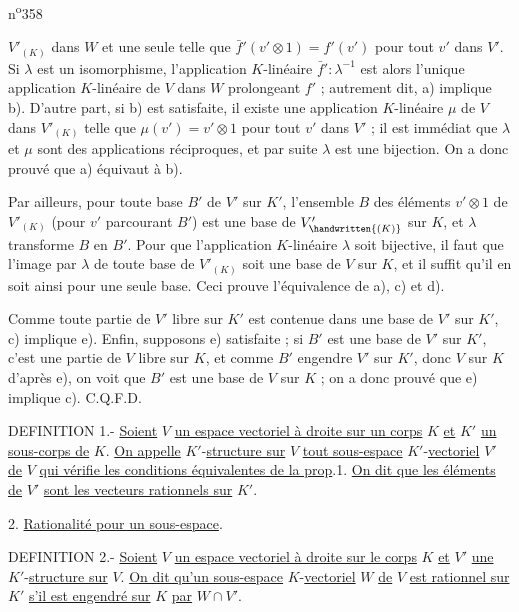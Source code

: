 \noindent\hfill n\textsuperscript{o}358

$V'_{(K)}$ dans $W$ et une seule telle que $\bar f'(v'\otimes 1)=f'(v')$ pour tout $v'$ dans $V'$. Si $\lambda$ est un isomorphisme, l'application $K$-linéaire $\bar f':\lambda^{-1}$ est alors l'unique application $K$-linéaire de $V$ dans $W$ prolongeant $f'$ ; autrement dit, a) implique b). D'autre part, si b) est satisfaite, il existe une application $K$-linéaire $\mu$ de $V$ dans $V'_{(K)}$ telle que $\mu(v')=v'\otimes 1$ pour tout $v'$ dans $V'$ ; il est immédiat que $\lambda$ et $\mu$ sont des applications réciproques, et par suite $\lambda$ est une bijection. On a donc prouvé que a) équivaut à b).

Par ailleurs, pour toute base $B'$ de $V'$ sur $K'$, l'ensemble $B$ des éléments $v'\otimes 1$ de $V'_{(K)}$ (pour $v'$ parcourant $B'$) est une base de $V'_{\handwritten{(K)}}$ sur $K$, et $\lambda$ transforme $B$ en $B'$. Pour que l'application $K$-linéaire $\lambda$ soit bijective, il faut que l'image par $\lambda$ de toute base de $V'_{(K)}$ soit une base de $V$ sur $K$, et il suffit qu'il en soit ainsi pour une seule base. Ceci prouve l'équivalence de a), c) et d).

Comme toute partie de $V'$ libre sur $K'$ est contenue dans une base de $V'$ sur $K'$, c) implique e). Enfin, supposons e) satisfaite ; si $B'$ est une base de $V'$ sur $K'$, c'est une partie de $V$ libre sur $K$, et comme $B'$ engendre $V'$ sur $K'$, donc $V$ sur $K$ d'après e), on voit que $B'$ est une base de $V$ sur $K$ ; on a donc prouvé que e) implique c). C.Q.F.D.

DEFINITION 1.- \uline{Soient} $V$ \uline{un espace vectoriel à droite sur un corps} $K$ \uline{et} $K'$ \uline{un sous-corps de} $K$. \uline{On appelle} $K'$-\uline{structure sur} $V$ \uline{tout sous-espace} $K'$-\uline{vectoriel} $V'$ \uline{de} $V$ \uline{qui vérifie les conditions équivalentes de la prop}.1. \uline{On dit que les éléments de} $V'$ \uline{sont les vecteurs rationnels sur} $K'$.

2. \uline{Rationalité pour un sous-espace}.

DEFINITION 2.- \uline{Soient} $V$ \uline{un espace vectoriel à droite sur le corps} $K$ \uline{et} $V'$ \uline{une} $K'$-\uline{structure sur} $V$. \uline{On dit qu'un sous-espace} $K$-\uline{vectoriel} $W$ \uline{de} $V$ \uline{est rationnel sur} $K'$ \uline{s'il est engendré sur} $K$ \uline{par} $W\cap V'$.

